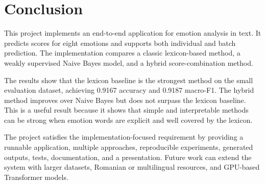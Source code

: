 \section{Conclusion}

This project implements an end-to-end application for emotion analysis in text. It predicts scores for eight emotions and supports both individual and batch prediction. The implementation compares a classic lexicon-based method, a weakly supervised Naive Bayes model, and a hybrid score-combination method.

The results show that the lexicon baseline is the strongest method on the small evaluation dataset, achieving 0.9167 accuracy and 0.9187 macro-F1. The hybrid method improves over Naive Bayes but does not surpass the lexicon baseline. This is a useful result because it shows that simple and interpretable methods can be strong when emotion words are explicit and well covered by the lexicon.

The project satisfies the implementation-focused requirement by providing a runnable application, multiple approaches, reproducible experiments, generated outputs, tests, documentation, and a presentation. Future work can extend the system with larger datasets, Romanian or multilingual resources, and GPU-based Transformer models.
